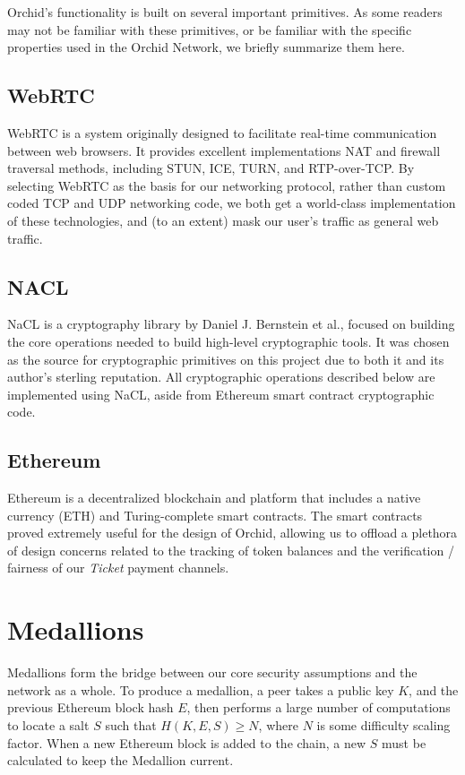 \documentclass{article}
\newcommand{\orchid}{Orchid}
\newcommand{\Orchid}{\orchid}
\begin{document}
\Orchid’s functionality is built on several important primitives. As some readers may not be familiar with these primitives, or be familiar with the specific properties used in the \Orchid{} Network, we briefly summarize them here.

\subsection{WebRTC}

WebRTC\cite{webrtc} is a system originally designed to facilitate real-time communication between web browsers. It provides excellent implementations NAT and firewall traversal methods, including STUN, ICE, TURN, and RTP-over-TCP. By selecting WebRTC as the basis for our networking protocol, rather than custom coded TCP and UDP networking code, we both get a world-class implementation of these technologies, and (to an extent) mask our user's traffic as general web traffic.

\subsection{NACL}

NaCL\cite{nacl} is a cryptography library by Daniel J. Bernstein et al., focused on building the core operations needed to build high-level cryptographic tools. It was chosen as the source for cryptographic primitives on this project due to both it and its author's sterling reputation. All cryptographic operations described below are implemented using NaCL, aside from Ethereum smart contract cryptographic code.

\subsection{Ethereum}

Ethereum\cite{ethereum} is a decentralized blockchain and platform that includes a native currency (ETH) and Turing-complete smart contracts. The smart contracts proved extremely useful for the design of \Orchid, allowing us to offload a plethora of design concerns related to the tracking of token balances and the verification / fairness of our \emph{Ticket} payment channels.

\section{Medallions}
\label{medallions}

Medallions form the bridge between our core security assumptions and the network as a whole. To produce a medallion, a peer takes a public key $K$, and the previous Ethereum block hash $E$, then performs a large number of computations to locate a salt $S$ such that $H(K, E, S) \geq N$, where $N$ is some difficulty scaling factor. When a new Ethereum block is added to the chain, a new $S$ must be calculated to keep the Medallion current.
\end{document}
